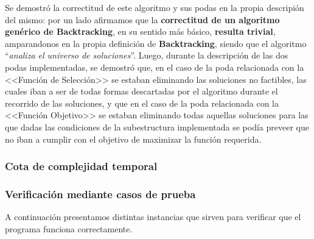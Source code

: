 \documentclass[11pt, a4paper, twoside]{article}
\begin{document}
Se demostró la correctitud de este algoritmo y sus podas en la propia descripión
del mismo: por un lado afirmamos que la \textbf{correctitud de un algoritmo
genérico de Backtracking}, en su sentido más básico, \textbf{resulta trivial},
amparandonos en la propia definición de \textbf{Backtracking}, siendo que el
algoritmo ``\emph{analiza el universo de soluciones}''. Luego, durante la
descripción de las dos podas implementadas, se demostró que, en el caso de la
poda relacionada con la <<Función de Selección>> se estaban eliminando las
soluciones no factibles, las cuales iban a ser de todas formas descartadas por
el algoritmo durante el recorrido de las soluciones, y que en el caso de la poda
relacionada con la <<Función Objetivo>> se estaban eliminando todas aquellas
soluciones para las que dadas las condiciones de la subestructura implementada
se podía preveer que no iban a cumplir con el objetivo de maximizar la función
requerida.

\subsubsection{Cota de complejidad temporal}

\subsubsection{Verificación mediante casos de prueba}

A continuación presentamos distintas instancias que sirven para verificar que el programa funciona correctamente.\\
\end{document}
